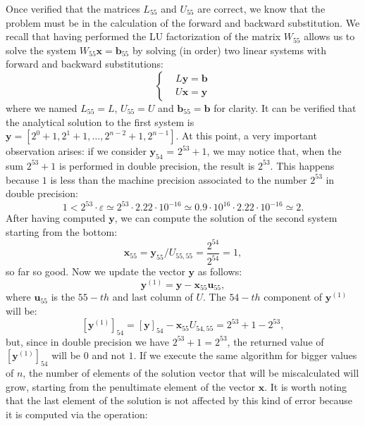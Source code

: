 \documentclass[a4paper]{report}
\numberwithin{equation}{chapter}
\begin{document}
\noindent  Once verified that the matrices $L_{55}$ and $U_{55}$ are correct, we know that the problem must be in the calculation of the forward and backward substitution. We recall that having performed the LU factorization of the matrix $W_{55}$ allows us to solve the system $W_{55} \textbf{x} = \textbf{b}_{55}$ by solving (in order) two linear systems with forward and backward substitutions:
\begin{equation}\label{key}
	\left\lbrace \begin{split}
		& L \textbf{y} = \textbf{b} \\
		& U \textbf{x} = \textbf{y}
	\end{split} \right. 
\end{equation}
where we named $L_{55} = L$, $U_{55} = U$ and $\textbf{b}_{55} = \textbf{b}$ for clarity.
It can be verified that the analytical solution to the first system is $\textbf{y} = [2^0 + 1, 2^1 + 1, \dots,2^{n-2}+1, 2^{n-1}]$. At this point, a very important observation arises: if we consider $\textbf{y}_{54}$ = $2^{53} + 1 $, we may notice that, when the sum $2^{53} + 1$ is performed in double precision, the result is $2^{53}$. This happens because $1$ is less than the machine precision associated to the number $2^{53}$ in double precision:
\begin{equation}\label{key}
	1< 2^{53} \cdot \varepsilon \simeq 2^{53} \cdot 2.22 \cdot 10^{-16} \simeq 0.9 \cdot 10^{16} \cdot 2.22 \cdot 10^{-16} \simeq 2.
\end{equation}
After having computed $\textbf{y}$, we can compute the solution of the second system starting from the bottom:
\begin{equation}\label{key}
	\textbf{x}_{55} = \textbf{y}_{55}/U_{55,55} = \frac{2^{54}}{2^{54}} = 1,
\end{equation}
so far so good. Now we update the vector $\textbf{y}$ as follows:
\begin{equation}\label{key}
	\textbf{y}^{(1)} = \textbf{y} - \textbf{x}_{55} \textbf{u}_{55},
\end{equation}
where $\textbf{u}_{55}$ is the $55-th$ and last column of $U$. The $54-th$ component of $\textbf{y}^{(1)}$ will be:
\begin{equation}\label{key}
	[\textbf{y}^{(1)}]_{54} = [\textbf{y}]_{54} - \textbf{x}_{55} U_{54,55} = 2^{53} + 1 - 2^{53},
\end{equation}
but, since in double precision we have $ 2^{53} + 1 = 2^{53}$, the returned value of  $[\textbf{y}^{(1)}]_{54}$ will be $0$ and not $1$. If we execute the same algorithm for bigger values of $n$, the number of elements of the solution vector that will be miscalculated will grow, starting from the penultimate element of the vector $\textbf{x}$. It is worth noting that the last element of the solution is not affected by this kind of error because it is computed via the operation:
\end{document}
